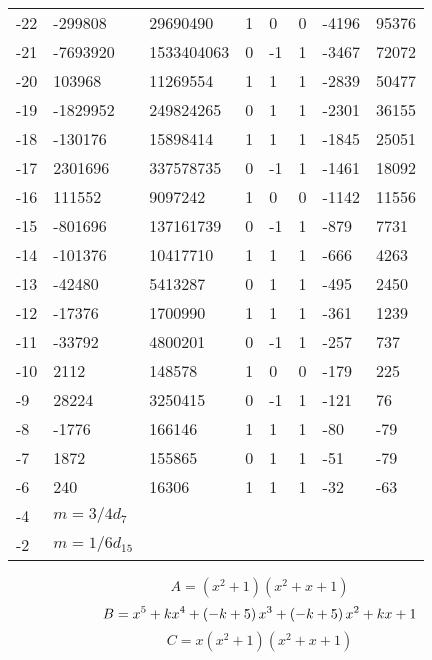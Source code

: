 \documentclass{amsart}
\begin{document}
\begin{longtable}{|l|l|l|lllll|}
-22&-299808&29690490&1&0&0&-4196&95376\\
-21&-7693920&1533404063&0&-1&1&-3467&72072\\
-20&103968&11269554&1&1&1&-2839&50477\\
-19&-1829952&249824265&0&1&1&-2301&36155\\
-18&-130176&15898414&1&1&1&-1845&25051\\
-17&2301696&337578735&0&-1&1&-1461&18092\\
-16&111552&9097242&1&0&0&-1142&11556\\
-15&-801696&137161739&0&-1&1&-879&7731\\
-14&-101376&10417710&1&1&1&-666&4263\\
-13&-42480&5413287&0&1&1&-495&2450\\
-12&-17376&1700990&1&1&1&-361&1239\\
-11&-33792&4800201&0&-1&1&-257&737\\
-10&2112&148578&1&0&0&-179&225\\
-9&28224&3250415&0&-1&1&-121&76\\
-8&-1776&166146&1&1&1&-80&-79\\
-7&1872&155865&0&1&1&-51&-79\\
-6&240&16306&1&1&1&-32&-63\\
-4&$m=3/4d_{7}$&&\multicolumn{5}{c|}{}\\
-2&$m=1/6d_{15}$&&\multicolumn{5}{c|}{}\\
\hline
\end{longtable}
$$A=(x^2
 + 1)(x^2
 + x
 + 1)$$
$$B=x^5
 + k\*x^4
 + \left(-k
 + 5\right) \*x^3
 + \left(-k
 + 5\right) \*x^2
 + k\*x
 + 1$$
$$C=x(x^2
 + 1)(x^2
 + x
 + 1)$$
\end{document}
